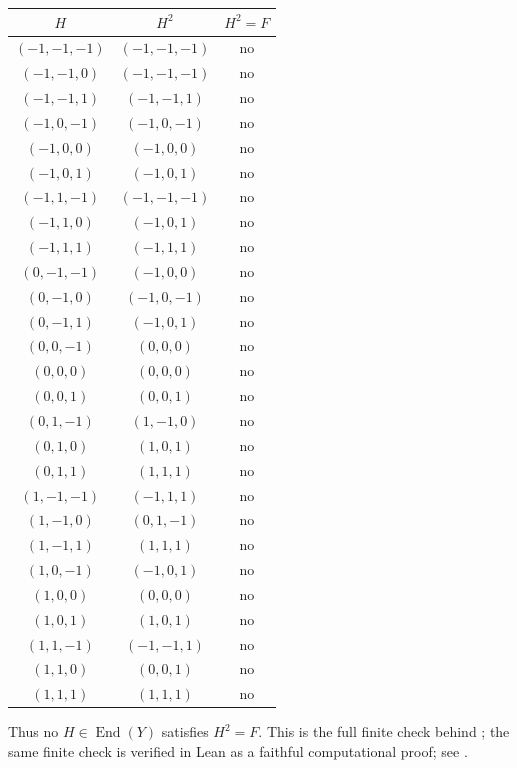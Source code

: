 \documentclass[11pt]{article}
\newcommand{\End}{\operatorname{End}}
\theoremstyle{definition}
\begin{document}
\begin{center}
\small
\begin{tabular}{ccc}
\(H\) & \(H^2\) & \(H^2=F\)\\
\hline
\((-1,-1,-1)\) & \((-1,-1,-1)\) & no \\
\((-1,-1,0)\) & \((-1,-1,-1)\) & no \\
\((-1,-1,1)\) & \((-1,-1,1)\) & no \\
\((-1,0,-1)\) & \((-1,0,-1)\) & no \\
\((-1,0,0)\) & \((-1,0,0)\) & no \\
\((-1,0,1)\) & \((-1,0,1)\) & no \\
\((-1,1,-1)\) & \((-1,-1,-1)\) & no \\
\((-1,1,0)\) & \((-1,0,1)\) & no \\
\((-1,1,1)\) & \((-1,1,1)\) & no \\
\((0,-1,-1)\) & \((-1,0,0)\) & no \\
\((0,-1,0)\) & \((-1,0,-1)\) & no \\
\((0,-1,1)\) & \((-1,0,1)\) & no \\
\((0,0,-1)\) & \((0,0,0)\) & no \\
\((0,0,0)\) & \((0,0,0)\) & no \\
\((0,0,1)\) & \((0,0,1)\) & no \\
\((0,1,-1)\) & \((1,-1,0)\) & no \\
\((0,1,0)\) & \((1,0,1)\) & no \\
\((0,1,1)\) & \((1,1,1)\) & no \\
\((1,-1,-1)\) & \((-1,1,1)\) & no \\
\((1,-1,0)\) & \((0,1,-1)\) & no \\
\((1,-1,1)\) & \((1,1,1)\) & no \\
\((1,0,-1)\) & \((-1,0,1)\) & no \\
\((1,0,0)\) & \((0,0,0)\) & no \\
\((1,0,1)\) & \((1,0,1)\) & no \\
\((1,1,-1)\) & \((-1,-1,1)\) & no \\
\((1,1,0)\) & \((0,0,1)\) & no \\
\((1,1,1)\) & \((1,1,1)\) & no \\
\end{tabular}
\end{center}

Thus no \(H\in\End(Y)\) satisfies \(H^2=F\).  This is the full finite check
behind ; the same finite check is verified in
Lean as a faithful computational proof; see .
\end{document}
